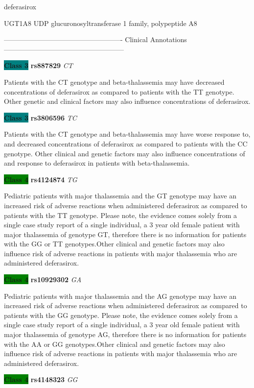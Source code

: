 \documentclass{resume} %
\begin{document}
\begin{rSection}{ deferasirox }
\begin{rSubsection}{ UGT1A8 }{ UDP glucuronosyltransferase 1 family, polypeptide A8 }{}{}
\item[] ---------------------------------------------------- Clinical Annotations -----------------------------------------------------\newline
\item \textbf{\colorbox{teal} {Class 3}} \textbf{ rs887829 } \textit{ CT }
\item[] Patients with the CT genotype and beta-thalassemia may have decreased concentrations of deferasirox as compared to patients with the TT genotype. Other genetic and clinical factors may also influence concentrations of deferasirox.\item \textbf{\colorbox{teal} {Class 3}} \textbf{ rs3806596 } \textit{ TC }
\item[] Patients with the CT genotype and beta-thalassemia may have worse response to, and decreased concentrations of deferasirox as compared to patients with the CC genotype. Other clinical and genetic factors may also influence concentrations of and response to deferasirox in patients with beta-thalassemia.\item \textbf{\colorbox{green} {Class 4}} \textbf{ rs4124874 } \textit{ TG }
\item[] Pediatric patients with major thalassemia and the GT genotype may have an increased risk of adverse reactions when administered deferasirox as compared to patients with the TT genotype. Please note, the evidence comes solely from a single case study report of a single individual, a 3 year old female patient with major thalassemia of genotype GT, therefore there is no information for patients with the GG or TT genotypes.Other clinical and genetic factors may also influence risk of adverse reactions in patients with major thalassemia who are administered deferasirox. \item \textbf{\colorbox{green} {Class 4}} \textbf{ rs10929302 } \textit{ GA }
\item[] Pediatric patients with major thalassemia and the AG genotype may have an increased risk of adverse reactions when administered deferasirox as compared to patients with the GG genotype. Please note, the evidence comes solely from a single case study report of a single individual, a 3 year old female patient with major thalassemia of genotype AG, therefore there is no information for patients with the AA or GG genotypes.Other clinical and genetic factors may also influence risk of adverse reactions in patients with major thalassemia who are administered deferasirox.\item \textbf{\colorbox{green} {Class 4}} \textbf{ rs4148323 } \textit{ GG }

\end{rSubsection}
\end{rSection}
\end{document}
